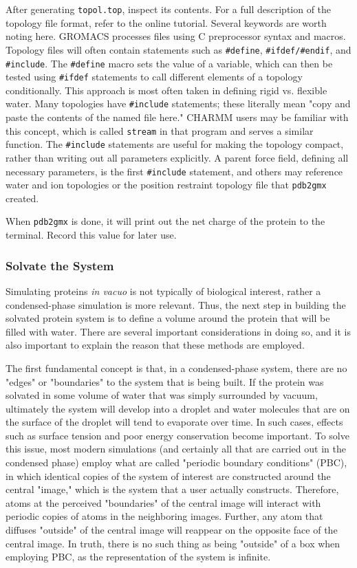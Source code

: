 \documentclass[9pt,tutorial]{livecoms}
\begin{document}
After generating \texttt{topol.top}, inspect its contents. For a full description of the topology file format, refer to the online tutorial. Several keywords are worth noting here. GROMACS processes files using C preprocessor syntax and macros. Topology files will often contain statements such as \texttt{\#define}, \texttt{\#ifdef/\#endif}, and \texttt{\#include}. The \texttt{\#define} macro sets the value of a variable, which can then be tested using \texttt{\#ifdef} statements to call different elements of a topology conditionally. This approach is most often taken in defining rigid vs. flexible water. Many topologies have \texttt{\#include} statements; these literally mean "copy and paste the contents of the named file here." CHARMM users may be familiar with this concept, which is called \texttt{stream} in that program and serves a similar function. The \texttt{\#include} statements are useful for making the topology compact, rather than writing out all parameters explicitly. A parent force field, defining all necessary parameters, is the first \texttt{\#include} statement, and others may reference water and ion topologies or the position restraint topology file that \texttt{pdb2gmx} created.

When \texttt{pdb2gmx} is done, it will print out the net charge of the protein to the terminal. Record this value for later use.

\subsubsection{Solvate the System} \label{lyso_solv}

Simulating proteins {\em in vacuo} is not typically of biological interest, rather a condensed-phase simulation is more relevant. Thus, the next step in building the solvated protein system is to define a volume around the protein that will be filled with water. There are several important considerations in doing so, and it is also important to explain the reason that these methods are employed.

The first fundamental concept is that, in a condensed-phase system, there are no "edges" or "boundaries" to the system that is being built. If the protein was solvated in some volume of water that was simply surrounded by vacuum, ultimately the system will develop into a droplet and water molecules that are on the surface of the droplet will tend to evaporate over time. In such cases, effects such as surface tension and poor energy conservation become important. To solve this issue, most modern simulations (and certainly all that are carried out in the condensed phase) employ what are called "periodic boundary conditions" (PBC), in which identical copies of the system of interest are constructed around the central "image," which is the system that a user actually constructs. Therefore, atoms at the perceived "boundaries" of the central image will interact with periodic copies of atoms in the neighboring images. Further, any atom that diffuses "outside" of the central image will reappear on the opposite face of the central image. In truth, there is no such thing as being "outside" of a box when employing PBC, as the representation of the system is infinite.
\end{document}
